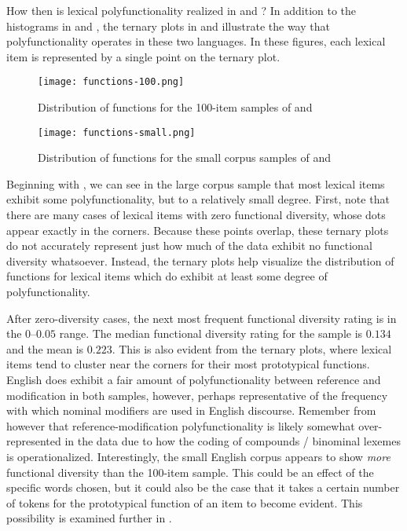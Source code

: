How then is lexical polyfunctionality realized in  and ? In addition to the histograms in  and , the ternary plots in  and  illustrate the way that polyfunctionality operates in these two languages. In these figures, each lexical item is represented by a single point on the ternary plot.

\begin{figure}[h!]
  \centering
  \caption{Distribution of functions for the 100-item samples of  and }
  \label{fig:ternary-100-items}
  \texttt{[image: functions-100.png]}
\end{figure}

\begin{figure}[h!]
  \centering
  \caption{Distribution of functions for the small corpus samples of  and }
  \label{fig:ternary-small-corpus}
  \texttt{[image: functions-small.png]}
\end{figure}

Beginning with , we can see in the large corpus sample that most lexical items exhibit some polyfunctionality, but to a relatively small degree. First, note that there are many cases of lexical items with zero functional diversity, whose dots appear exactly in the corners. Because these points overlap, these ternary plots do not accurately represent just how much of the data exhibit no functional diversity whatsoever. Instead, the ternary plots help visualize the distribution of functions for lexical items which do exhibit at least some degree of polyfunctionality.

After zero-diversity cases, the next most frequent functional diversity rating is in the $0$–$0.05$ range. The median functional diversity rating for the sample is $0.134$ and the mean is $0.223$. This is also evident from the ternary plots, where lexical items tend to cluster near the corners for their most prototypical functions. English does exhibit a fair amount of polyfunctionality between reference and modification in both samples, however, perhaps representative of the frequency with which nominal modifiers are used in English discourse. Remember from  however that reference-modification polyfunctionality is likely somewhat over-represented in the data due to how the coding of compounds / binominal lexemes is operationalized. Interestingly, the small English corpus appears to show \emph{more} functional diversity than the 100-item sample. This could be an effect of the specific words chosen, but it could also be the case that it takes a certain number of tokens for the prototypical function of an item to become evident. This possibility is examined further in .

